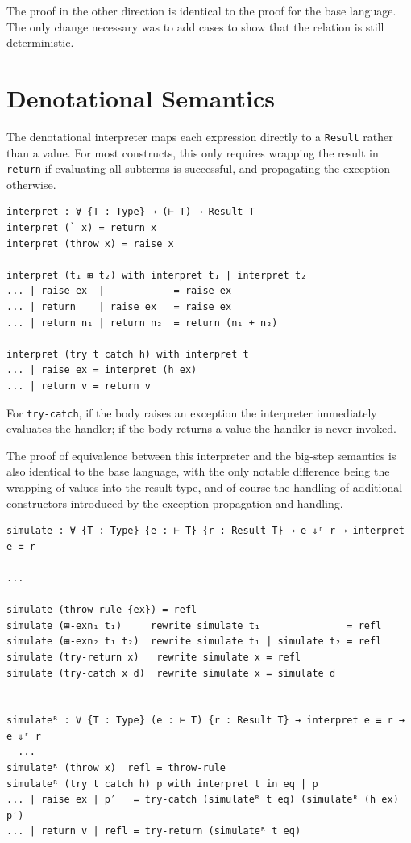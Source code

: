 The proof in the other direction is identical to the proof for the base language. The only change necessary was to add cases to show that the relation is still deterministic.


\section{Denotational Semantics}

The denotational interpreter maps each expression directly to a \texttt{Result} rather than a value. For most constructs, this only requires wrapping the result in \texttt{return} if evaluating all subterms is successful, and propagating the exception otherwise.


\begin{verbatim}
interpret : ∀ {T : Type} → (⊢ T) → Result T
interpret (` x) = return x
interpret (throw x) = raise x

interpret (t₁ ⊞ t₂) with interpret t₁ | interpret t₂
... | raise ex  | _          = raise ex
... | return _  | raise ex   = raise ex
... | return n₁ | return n₂  = return (n₁ + n₂)

interpret (try t catch h) with interpret t
... | raise ex = interpret (h ex)
... | return v = return v
\end{verbatim}

For \texttt{try-catch}, if the body raises an exception the interpreter immediately evaluates the handler; if the body returns a value the handler is never invoked.

The proof of equivalence between this interpreter and the big-step semantics is also identical to the base language, with the only notable difference being the wrapping of values into the result type, and of course the handling of additional constructors introduced by the exception propagation and handling.
\begin{verbatim}
simulate : ∀ {T : Type} {e : ⊢ T} {r : Result T} → e ⇓ʳ r → interpret e ≡ r

...

simulate (throw-rule {ex}) = refl
simulate (⊞-exn₁ t₁)     rewrite simulate t₁               = refl
simulate (⊞-exn₂ t₁ t₂)  rewrite simulate t₁ | simulate t₂ = refl
simulate (try-return x)   rewrite simulate x = refl
simulate (try-catch x d)  rewrite simulate x = simulate d


simulateᴿ : ∀ {T : Type} (e : ⊢ T) {r : Result T} → interpret e ≡ r → e ⇓ʳ r
  ...
simulateᴿ (throw x)  refl = throw-rule
simulateᴿ (try t catch h) p with interpret t in eq | p
... | raise ex | p′   = try-catch (simulateᴿ t eq) (simulateᴿ (h ex) p′)
... | return v | refl = try-return (simulateᴿ t eq)
\end{verbatim}


